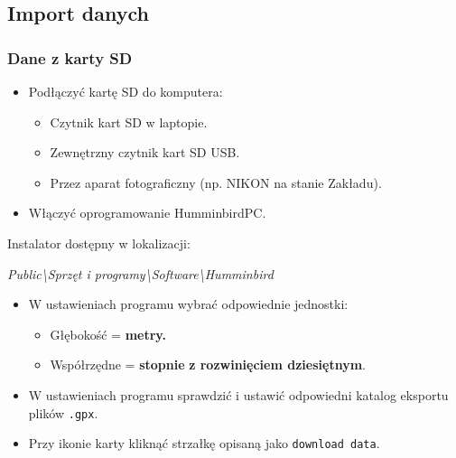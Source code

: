 \documentclass[
  letterpaper,
  DIV=11,
  numbers=noendperiod]{scrreprt}
\providecommand{\tightlist}{%
  \setlength{\itemsep}{0pt}\setlength{\parskip}{0pt}}\usepackage{longtable,booktabs,array}
\begin{document}
\hypertarget{import-danych}{%
\subsection{Import danych}\label{import-danych}}

\hypertarget{dane-z-karty-sd}{%
\subsubsection{Dane z karty SD}\label{dane-z-karty-sd}}

\begin{itemize}
\tightlist
\item
  Podłączyć kartę SD do komputera:

  \begin{itemize}
  \item
    Czytnik kart SD w laptopie.
  \item
    Zewnętrzny czytnik kart SD USB.
  \item
    Przez aparat fotograficzny (np. NIKON na stanie Zakładu).
  \end{itemize}
\item
  Włączyć oprogramowanie HumminbirdPC.
\end{itemize}

\begin{tcolorbox}[enhanced jigsaw, toptitle=1mm, bottomtitle=1mm, opacitybacktitle=0.6, colframe=quarto-callout-note-color-frame, bottomrule=.15mm, title=\textcolor{quarto-callout-note-color}{\faInfo}\hspace{0.5em}{Instalator}, colbacktitle=quarto-callout-note-color!10!white, left=2mm, breakable, rightrule=.15mm, colback=white, opacityback=0, arc=.35mm, coltitle=black, leftrule=.75mm, toprule=.15mm, titlerule=0mm]

Instalator dostępny w lokalizacji:

\emph{Public\textbackslash Sprzęt i
programy\textbackslash Software\textbackslash Humminbird}

\end{tcolorbox}

\begin{itemize}
\tightlist
\item
  W ustawieniach programu wybrać odpowiednie jednostki:

  \begin{itemize}
  \tightlist
  \item
    Głębokość = \textbf{metry.}
  \item
    Współrzędne = \textbf{stopnie} \textbf{z rozwinięciem dziesiętnym}.
  \end{itemize}
\item
  W ustawieniach programu sprawdzić i ustawić odpowiedni katalog
  eksportu plików \texttt{.gpx}.
\item
  Przy ikonie karty kliknąć strzałkę opisaną jako
  \texttt{download\ data}.
\end{itemize}
\end{document}
